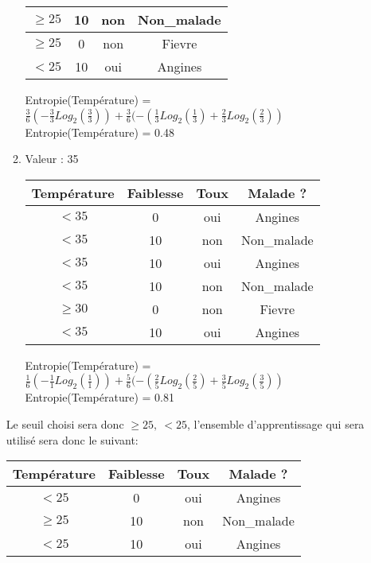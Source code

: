 \documentclass[a4paper, 11pt]{report}
\begin{document}
\begin{itemize}
\begin{enumerate}
\begin{center}
\begin{tabular}{| c | c | c | c |}
$\ge 25$ & 10 & non & Non\_malade\\
\hline

$\ge 25$ & 0 & non & Fievre\\
\hline

$<25$ & 10 & oui & Angines\\
\hline
\end{tabular}
\end{center}

Entropie(Température) = $\frac{3}{6}( - \frac{3}{3}Log_2(\frac{3}{3}))+\frac{3}{6}(- (\frac{1}{3}
Log_2(\frac{1}{3})+ \frac{2}{3}Log_2(\frac{2}{3}))$\\
Entropie(Température) = 0.48




\item Valeur : 35


\begin{center}
\begin{tabular}{| c | c | c | c |}
\hline
Température & Faiblesse & Toux & Malade ?\\
\hline
$<35$ & 0 & oui & Angines\\
\hline
$<35$ & 10 & non & Non\_malade\\
\hline
$<35$ & 10 & oui & Angines\\
\hline

$<35$ & 10 & non & Non\_malade\\
\hline

$\ge 30$ & 0 & non & Fievre\\
\hline

$<35$ & 10 & oui & Angines\\
\hline
\end{tabular}
\end{center}

Entropie(Température) = $\frac{1}{6}( - \frac{1}{1}Log_2(\frac{1}{1}))+\frac{5}{6}(- (\frac{2}{5}Log_2(\frac{2}{5})+ \frac{3}{5}Log_2(\frac{3}{5}))$\\
Entropie(Température) = 0.81
\end{enumerate}
Le seuil choisi sera donc $\ge 25, \ <25$, l'ensemble d'apprentissage qui sera utilisé sera donc le suivant: \\

\begin{center}
\begin{tabular}{| c | c | c | c |}
\hline
Température & Faiblesse & Toux & Malade ?\\
\hline
$<25$ & 0 & oui & Angines\\
\hline
$\ge 25$ & 10 & non & Non\_malade\\
\hline
$<25$ & 10 & oui & Angines\\
\hline


\end{tabular}
\end{center}
\end{itemize}
\end{document}

